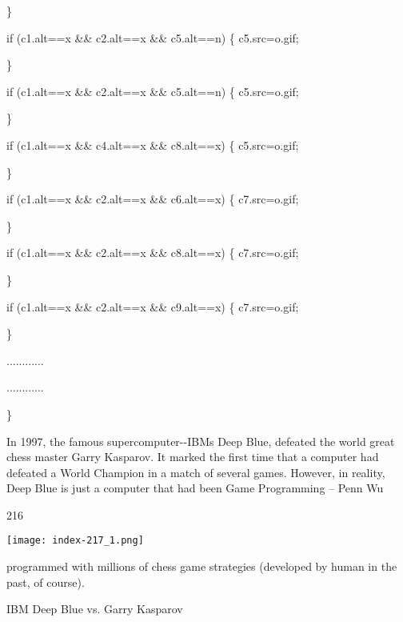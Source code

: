 \documentclass[
]{article}
\begin{document}
\}

if (c1.alt==\textquotesingle x\textquotesingle{} \&\&
c2.alt==\textquotesingle x\textquotesingle{} \&\&
c5.alt==\textquotesingle n\textquotesingle) \{
c5.src=\textquotesingle o.gif\textquotesingle;

\}

if (c1.alt==\textquotesingle x\textquotesingle{} \&\&
c2.alt==\textquotesingle x\textquotesingle{} \&\&
c5.alt==\textquotesingle n\textquotesingle) \{
c5.src=\textquotesingle o.gif\textquotesingle;

\}

if (c1.alt==\textquotesingle x\textquotesingle{} \&\&
c4.alt==\textquotesingle x\textquotesingle{} \&\&
c8.alt==\textquotesingle x\textquotesingle) \{
c5.src=\textquotesingle o.gif\textquotesingle;

\}

if (c1.alt==\textquotesingle x\textquotesingle{} \&\&
c2.alt==\textquotesingle x\textquotesingle{} \&\&
c6.alt==\textquotesingle x\textquotesingle) \{
c7.src=\textquotesingle o.gif\textquotesingle;

\}

if (c1.alt==\textquotesingle x\textquotesingle{} \&\&
c2.alt==\textquotesingle x\textquotesingle{} \&\&
c8.alt==\textquotesingle x\textquotesingle) \{
c7.src=\textquotesingle o.gif\textquotesingle;

\}

if (c1.alt==\textquotesingle x\textquotesingle{} \&\&
c2.alt==\textquotesingle x\textquotesingle{} \&\&
c9.alt==\textquotesingle x\textquotesingle) \{
c7.src=\textquotesingle o.gif\textquotesingle;

\}

............

............

\}

In 1997, the famous supercomputer-\/-IBM\textquotesingle s Deep Blue,
defeated the world great chess master Garry Kasparov. It marked the
first time that a computer had defeated a World Champion in a match of
several games. However, in reality, Deep Blue is just a computer that
had been Game Programming -- Penn Wu

216

\protect\hypertarget{index_split_011.htmlux5cux23p217}{}{}\texttt{[image: index-217\_1.png]}

programmed with millions of chess game strategies (developed by human in
the past, of course).

IBM Deep Blue vs. Garry Kasparov
\end{document}
